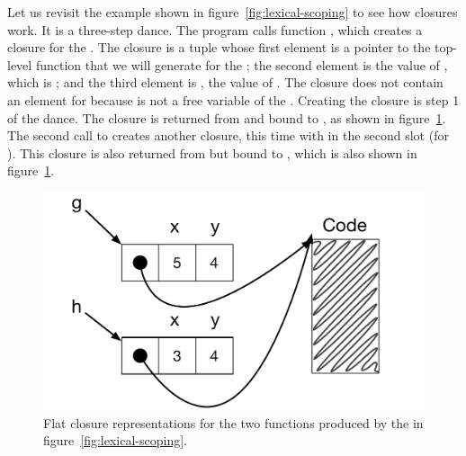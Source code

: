 \documentclass[7x10]{TimesAPriori_MIT}%
\numberwithin{theorem}{chapter}
\numberwithin{definition}{chapter}
\numberwithin{equation}{chapter}
\begin{document}
Let us revisit the example shown in figure~\ref{fig:lexical-scoping}
to see how closures work. It is a three-step dance. The program calls
function , which creates a closure for the . The
closure is a tuple whose first element is a pointer to the top-level
function that we will generate for the ; the second
element is the value of , which is ; and the third
element is , the value of . The closure does not
contain an element for  because  is not a free
variable of the . Creating the closure is step 1 of the
dance. The closure is returned from  and bound to , as
shown in figure~\ref{fig:closures}.
%
The second call to  creates another closure, this time with
 in the second slot (for ). This closure is also
returned from  but bound to , which is also shown in
figure~\ref{fig:closures}.

\begin{figure}[tbp]
  \centering
  \begin{minipage}{0.65\textwidth}
  \begin{tcolorbox}[colback=white]
    \includegraphics[width=\textwidth]{figs/closures}
  \end{tcolorbox}
  \end{minipage}
\caption{Flat closure representations for the two functions
  produced by the  in figure~\ref{fig:lexical-scoping}.}
\label{fig:closures}
\end{figure}
\end{document}
